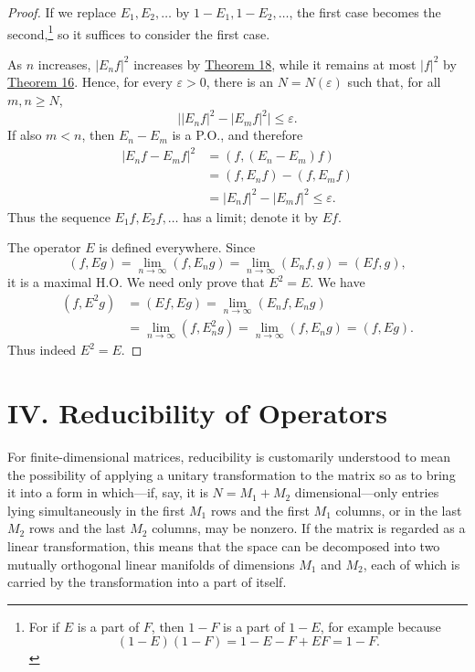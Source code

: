 ﻿\documentclass[paper=b5,fontsize=13pt,bookmarkpackage=false,twoside]{scrartcl}
\begin{document}
\begin{proof}
If we replace $E_1,E_2,\ldots$ by $1-E_1,1-E_2,\ldots$, the first case becomes the second,\footnote{\label{fn:39}For if $E$ is a part of $F$, then $1-F$ is a part of $1-E$, for example because
\[
(1-E)(1-F)=1-E-F+EF=1-F.
\]} so it suffices to consider the first case.

As $n$ increases, $|E_nf|^2$ increases by \hyperref[thm:18]{Theorem 18}, while it remains at most $|f|^2$ by \hyperref[thm:16]{Theorem 16}. Hence, for every $\varepsilon>0$, there is an $N=N(\varepsilon)$ such that, for all $m,n\ge N$,
\[
\bigl||E_nf|^2-|E_mf|^2\bigr|\le\varepsilon.
\]
If also $m<n$, then $E_n-E_m$ is a P.O., and therefore
\begin{align*}
|E_nf-E_mf|^2
 &=(f,(E_n-E_m)f)\\
 &=(f,E_nf)-(f,E_mf)\\
 &=|E_nf|^2-|E_mf|^2\le\varepsilon.
\end{align*}
Thus the sequence $E_1f,E_2f,\ldots$ has a limit; denote it by $Ef$.

The operator $E$ is defined everywhere. Since
\[
(f,Eg)=\lim_{n\to\infty}(f,E_ng)
      =\lim_{n\to\infty}(E_nf,g)
      =(Ef,g),
\]
it is a maximal H.O. We need only prove that $E^2=E$. We have
\begin{align*}
(f,E^2g)
 &=(Ef,Eg)
  =\lim_{n\to\infty}(E_nf,E_ng)\\
 &=\lim_{n\to\infty}(f,E_n^2g)
  =\lim_{n\to\infty}(f,E_ng)
  =(f,Eg).
\end{align*}
Thus indeed $E^2=E$.
\end{proof}

\section*{IV. Reducibility of Operators}\label{chap:IV}

For finite-dimensional matrices, reducibility is customarily understood to mean the possibility of applying a unitary transformation to the matrix so as to bring it into a form in which---if, say, it is $N=M_1+M_2$ dimensional---only entries lying simultaneously in the first $M_1$ rows and the first $M_1$ columns, or in the last $M_2$ rows and the last $M_2$ columns, may be nonzero. If the matrix is regarded as a linear transformation, this means that the space can be decomposed into two mutually orthogonal linear manifolds of dimensions $M_1$ and $M_2$, each of which is carried by the transformation into a part of itself.
\end{document}
